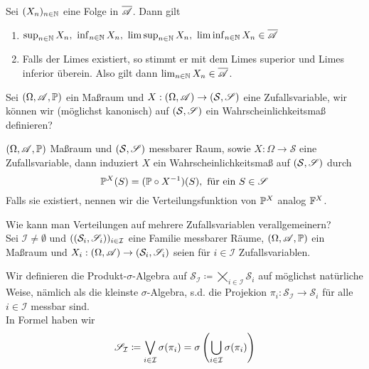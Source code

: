 \documentclass{scrartcl}
\begin{document}
    \begin{lemma} Sei $(X_n)_{n\in \N}$ eine Folge in $\overline{\cali{A}}$. Dann gilt
        \begin{enumerate}[(1)]
            \item $\sup_{n\in \N} X_n, \ \inf_{n\in \N} X_n, \ \limsup_{n\in \N} X_n, \ \liminf_{n\in\N} X_n \in \overline{\cali{A}}$
            \item Falls der Limes existiert, so stimmt er mit dem Limes superior und Limes inferior überein. Also gilt dann $\lim_{n\in \N}X_n \in \overline{\cali{A}}$.
        \end{enumerate}
    \end{lemma}
    Sei $(\Omega,\cali{A},\P)$ ein Maßraum und $X:(\Omega,\cali{A})\to (\mathcal{S},\cali{S})$ eine Zufallsvariable, wir können wir (möglichst kanonisch) auf $(\mathcal{S},\cali{S})$ ein Wahrscheinlichkeitsmaß definieren?
    \begin{defn}
        $(\Omega,\cali{A},\P)$ Maßraum und $(\mathcal{S},\cali{S})$ messbarer Raum, sowie $X:\Omega\to\mathcal{S}$ eine Zufallsvariable, dann induziert $X$ ein Wahrscheinlichkeitsmaß auf $(\mathcal{S},\cali{S})$ durch
        \[
        \P^X(S) = (\P\circ X^{-1})(S), \ \text{für ein } S\in \cali{S}    
        \] Falls sie existiert, nennen wir die Verteilungsfunktion von $\P^X$ analog $\F^X$.
        \end{defn}
        Wie kann man Verteilungen auf mehrere Zufallsvariablen verallgemeinern? \\
        Sei $\mathcal{I}\neq \emptyset$ und $((\mathcal{S}_i,\cali{S}_i))_{i\in \mathcal{I}}$ eine Familie messbarer Räume, $(\Omega,\cali{A},\P)$ ein Maßraum und $X_i:(\Omega,\cali{A})\to(\mathcal{S}_i,\cali{S}_i)$ seien für $i\in \mathcal{I}$ Zufallsvariablen.
        \begin{defn}
            Wir definieren die Produkt-$\sigma$-Algebra auf $\mathcal{S}_\mathcal{I}\coloneqq \bigtimes_{i\in \mathcal{I}} \mathcal{S}_i$ auf möglichst natürliche Weise, nämlich als die kleinste $\sigma$-Algebra, s.d. die Projekion $\pi_i:\mathcal{S}_\mathcal{I} \to \mathcal{S}_i$ für alle $i\in \mathcal{I}$ messbar sind. 
            \\ In Formel haben wir 
            \[
            \cali{S}_\mathcal{I} \coloneqq \bigvee_{i\in \mathcal{I}} \sigma(\pi_i) = \sigma\left(\bigcup_{i\in \mathcal{I}}\sigma(\pi_i)\right)     
            \]
        \end{defn}
\end{document}
